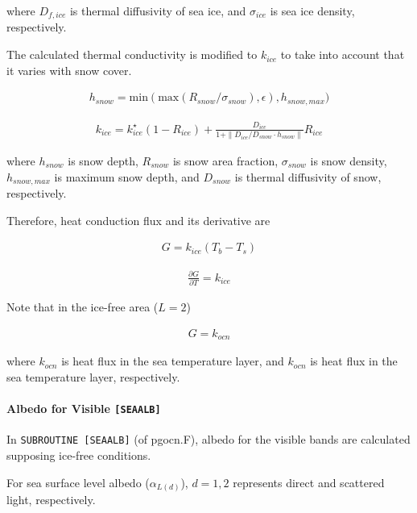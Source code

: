 where \(D_{f,ice}\) is thermal diffusivity of sea ice, and
\(\sigma_{ice}\) is sea ice density, respectively.

The calculated thermal conductivity is modified to \(k_{ice}\) to take
into account that it varies with snow cover.

\begin{eqnarray}
h_{snow} = \mathrm{min}(
    \mathrm{max}(
    R_{snow}/\sigma_{snow}),\epsilon
        ),h_{snow,max}
        )
\end{eqnarray}

\begin{eqnarray}      
k_{ice} = k_{ice}^\star (1-R_{ice}) + \frac{D_{ice}}{1+\| D_{ice}/D_{snow} \cdot h_{snow} \|} R_{ice}
\end{eqnarray}

where \(h_{snow}\) is snow depth, \(R_{snow}\) is snow area fraction,
\(\sigma_{snow}\) is snow density, \(h_{snow,max}\) is maximum snow
depth, and \(D_{snow}\) is thermal diffusivity of snow, respectively.

Therefore, heat conduction flux and its derivative are

\begin{eqnarray}
 G = k_{ice} (T_b - T_s)
\end{eqnarray}

\begin{eqnarray}
 \frac{\partial G}{\partial T} = k_{ice}
\end{eqnarray}

Note that in the ice-free area (\(L=2\))

\begin{eqnarray}
G=k_{ocn}
\end{eqnarray}

where \(k_{ocn}\) is heat flux in the sea temperature layer, and
\(k_{ocn}\) is heat flux in the sea temperature layer, respectively.

\hypertarget{albedo-for-visible-seaalb}{%
\paragraph{\texorpdfstring{Albedo for Visible
\texttt{{[}SEAALB{]}}}{Albedo for Visible {[}SEAALB{]}}}\label{albedo-for-visible-seaalb}}

In \texttt{SUBROUTINE\ {[}SEAALB{]}} (of pgocn.F), albedo for the
visible bands are calculated supposing ice-free conditions.

For sea surface level albedo (\(\alpha_{L(d)}\)), \(d=1,2\) represents
direct and scattered light, respectively.

